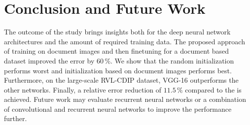 \section{Conclusion and Future Work}



The outcome of the study brings insights both for the deep neural network architectures and the amount of required training data. The proposed approach of training on document images and then finetuning for a document based dataset improved the error by $60\,\%$.
We show that the random initialization performs worst and initialization based on document images performs best.
Furthermore, on the large-scale RVL-CDIP dataset, VGG-16 outperforms the other networks.
Finally, a relative error reduction of $11.5\,\%$ compared to the \sota is achieved. 
Future work may evaluate recurrent neural networks or a combination of convolutional and recurrent neural networks to improve the performance further.


